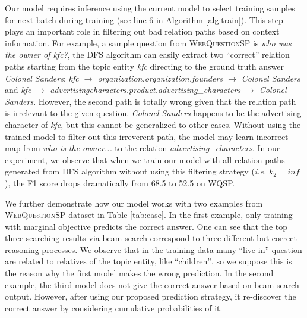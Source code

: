 Our model requires inference using the current model to select training samples for next batch during training (see line 6 in Algorithm \ref{alg:train}). This step plays an important role in filtering out bad relation paths based on context information. For example, a sample question from \textsc{WebQuestionSP} is \textit{who was the owner of kfc?}, the DFS algorithm can easily extract two ``correct'' relation paths starting from the topic entity \textit{kfc} directing to the ground truth answer \textit{Colonel Sanders}: \textit{kfc $\rightarrow$ organization.organization.founders $\rightarrow$ Colonel Sanders} and \textit{kfc $\rightarrow$ advertisingcharacters.product.advertising\_characters $\rightarrow$ Colonel Sanders}. However, the second path is totally wrong given that the relation path is irrelevant to the given question. \textit{Colonel Sanders} happens to be the advertising character of \textit{kfc}, but this cannot be generalized to other cases. Without using the trained model to filter out this irreverent path, the model may learn incorrect map from \textit{who is the owner...} to the relation \textit{advertising\_characters}. In our experiment, we observe that when we train our model with all relation paths generated from DFS algorithm without using this filtering strategy (\emph{i.e.} $k_2=inf$), the F1 score drops dramatically from 68.5 to 52.5 on WQSP.





We further demonstrate how our model works with two examples from \textsc{WebQuestionSP} dataset in Table \ref{tab:case}. In the first example, only training with marginal objective predicts the correct answer. One can see that the top three searching results via beam search correspond to three different but correct reasoning processes. We observe that in the training data many ``live in'' question are related to relatives of the topic entity, like ``children'', so we suppose this is the reason why the first model makes the wrong prediction. In the second example, the third model does not give the correct answer based on beam search output. However, after using our proposed prediction strategy, it re-discover the correct answer by considering cumulative probabilities of it.

